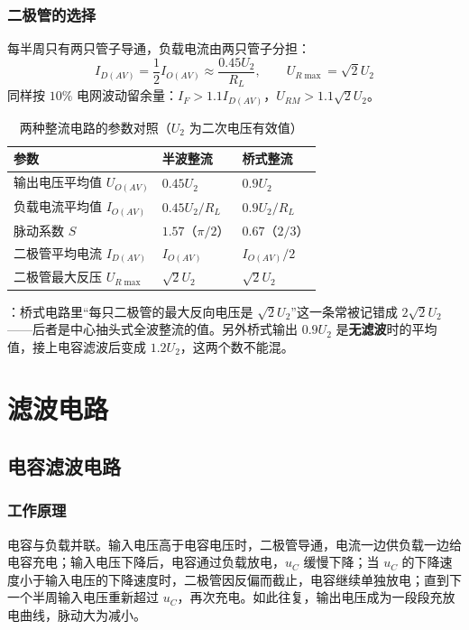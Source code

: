 \subsubsection{二极管的选择}
每半周只有两只管子导通，负载电流由两只管子分担：
\begin{equation}
I_{D(AV)}=\frac{1}{2}I_{O(AV)}\approx\frac{0.45U_2}{R_L},\qquad
U_{R\max}=\sqrt2U_2
\end{equation}
同样按 $10\%$ 电网波动留余量：$I_F>1.1I_{D(AV)}$，$U_{RM}>1.1\sqrt2U_2$。

\begin{table}[htbp]
\centering
\caption{两种整流电路的参数对照（$U_2$ 为二次电压有效值）}
\begin{tabular}{@{}lll@{}}
\hline
参数 & 半波整流 & 桥式整流 \\
\hline
输出电压平均值 $U_{O(AV)}$ & $0.45U_2$ & $0.9U_2$ \\
负载电流平均值 $I_{O(AV)}$ & $0.45U_2/R_L$ & $0.9U_2/R_L$ \\
脉动系数 $S$ & $1.57$（$\pi/2$） & $0.67$（$2/3$）\\
二极管平均电流 $I_{D(AV)}$ & $I_{O(AV)}$ & $I_{O(AV)}/2$ \\
二极管最大反压 $U_{R\max}$ & $\sqrt2U_2$ & $\sqrt2U_2$ \\
\hline
\end{tabular}
\end{table}

：桥式电路里“每只二极管的最大反向电压是 $\sqrt2U_2$”这一条常被记错成 $2\sqrt2U_2$——后者是中心抽头式全波整流的值。另外桥式输出 $0.9U_2$ 是\textbf{无滤波}时的平均值，接上电容滤波后变成 $1.2U_2$，这两个数不能混。

\section{滤波电路}
\subsection{电容滤波电路}
\subsubsection{工作原理}
电容与负载并联。输入电压高于电容电压时，二极管导通，电流一边供负载一边给电容充电；输入电压下降后，电容通过负载放电，$u_C$ 缓慢下降；当 $u_C$ 的下降速度小于输入电压的下降速度时，二极管因反偏而截止，电容继续单独放电；直到下一个半周输入电压重新超过 $u_C$，再次充电。如此往复，输出电压成为一段段充放电曲线，脉动大为减小。

